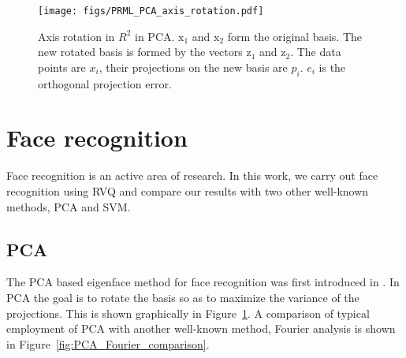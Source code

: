 \begin{figure}
\centering
\texttt{[image: figs/PRML\_PCA\_axis\_rotation.pdf]}
\caption{Axis rotation in $R^2$ in PCA.  $\mathrm{x}_1$ and $\mathrm{x}_2$ form the original basis.  The new rotated basis is formed by the vectors $\mathrm{z}_1$ and $\mathrm{z}_2$.  The data points are $x_i$, their projections on the new basis are $p_i$.  $e_i$ is the orthogonal projection error.}
\label{fig:PCA_axis_rotation}
\end{figure}

%
%
%
%



\section{Face recognition}
Face recognition is an active area of research.  In this work, we carry out face recognition using RVQ and compare our results with two other well-known methods, PCA and SVM.  

\subsection{PCA}
The PCA based eigenface method for face recognition was first introduced in \cite{1991_JNL_Eigenfaces_Turk}.  In PCA the goal is to rotate the basis so as to maximize the variance of the projections.  This is shown graphically in Figure~\ref{fig:PCA_axis_rotation}.  A comparison of typical employment of PCA with another well-known method, Fourier analysis is shown in Figure~\ref{fig:PCA_Fourier_comparison}.



